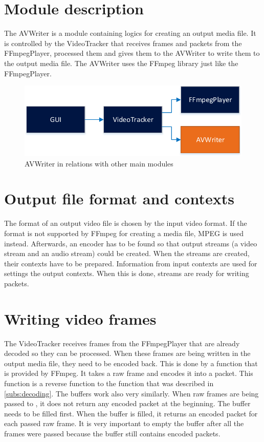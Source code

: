 \section{Module description}
The AVWriter is a module containing logics for creating an output media file. It is controlled by the VideoTracker that receives frames and packets from the FFmpegPlayer, processed them and gives them to the AVWriter to write them to the output media file. The AVWriter uses the FFmpeg library just like the FFmpegPlayer.
\begin{figure}[!htbp]
\centering
\includegraphics{fig/avwriter}
\caption{AVWriter in relations with other main modules}
\label{fig:avwriter}
\end{figure}

\section{Output file format and contexts}
The format of an output video file is chosen by the input video format. If the format is not supported by FFmpeg for creating a media file, MPEG is used instead. Afterwards, an encoder has to be found so that output streams (a video stream and an audio stream) could be created. When the streams are created, their contexts have to be prepared. Information from input contexts are used for settings the output contexts. When this is done, streams are ready for writing packets. 

\section{Writing video frames}
The VideoTracker receives frames from the FFmpegPlayer that are already decoded so they can be processed. When these frames are being written in the output media file, they need to be encoded back. This is done by a function  that is provided by FFmpeg. It takes a raw frame and encodes it into a packet. This function is a reverse function to the function  that was described in \autoref{subs:decoding}. The buffers work also very similarly. When raw frames are being passed to , it does not return any encoded packet at the beginning. The buffer needs to be filled first. When the buffer is filled, it returns an encoded packet for each passed raw frame. It is very important to empty the buffer after all the frames were passed because the buffer still contains encoded packets.

